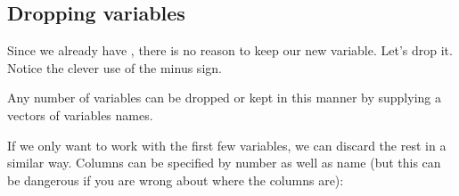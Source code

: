 \subsection{Dropping variables}
Since we already have , there is no reason to keep our new variable.  Let's drop it.
Notice the clever use of the minus sign.
\begin{knitrout}
\end{knitrout}

Any number of variables can be dropped or kept in this manner by supplying a vectors
of variables names.
\begin{knitrout}
\end{knitrout}


If we only want to work with the first few variables, we can discard the rest in a similar way.
Columns can be specified by number as well as name (but this can be dangerous if you are wrong 
about where the columns are):
\begin{knitrout}
\end{knitrout}


